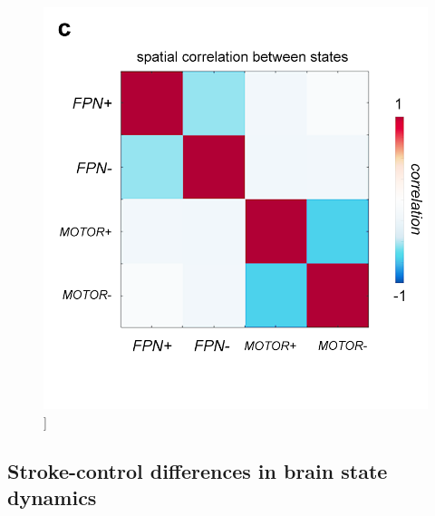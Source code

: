 \documentclass[phd,tocprelim]{cornell}
\renewcommand{\caption}[1]{\singlespacing\hangcaption{#1}\normalspacing}
\begin{document}
\begin{figure}[h!]
		\ContinuedFloat
		\captionsetup{labelformat=adja-page}
    \centering
    \includegraphics[width=1\textwidth]{chapter2/Figure2c.png}
    \caption[]{}
\end{figure}
\null
\vfill

    \subsection{Stroke-control differences in brain state dynamics}
\end{document}
